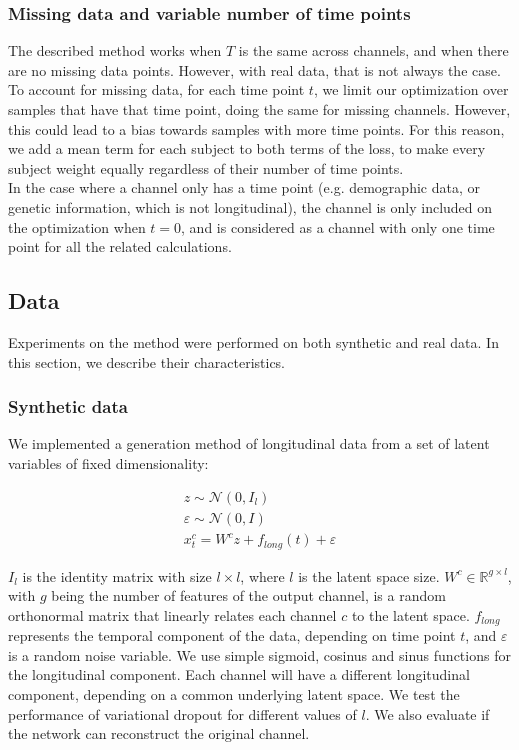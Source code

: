 \subsubsection{Missing data and variable number of time points}

The described method works when $T$ is the same across channels, and when there are no missing data points. However, with real data, that is not always the case. To account for missing data, for each time point $t$, we limit our optimization over samples that have that time point, doing the same for missing channels. However, this could lead to a bias towards samples with more time points. For this reason, we add a mean term for each subject to both terms of the loss, to make every subject weight equally regardless of their number of time points. \\

In the case where a channel only has a time point (e.g. demographic data, or genetic information, which is not longitudinal), the channel is only included on the optimization when $t=0$, and is considered as a channel with only one time point for all the related calculations.

\subsection{Data}

Experiments on the method were performed on both synthetic and real data. In this section, we describe their characteristics.

\subsubsection{Synthetic data}

We implemented a generation method of longitudinal data from a set of latent variables of fixed dimensionality:

\begin{equation} 
\begin{gathered} \label{rnn:eq:synthdata}
   z \sim \mathcal{N}(0, I_{l}) \\
   \varepsilon \sim \mathcal{N}(0, I) \\
   x^c_t = W^{c}z + f_{long}(t) + \varepsilon
\end{gathered}
\end{equation}

$I_{l}$ is the identity matrix with size $l \times l$, where $l$ is the latent space size. $W^c \in \mathbb{R}^{g \times l}$, with $g$ being the number of features of the output channel, is a random orthonormal matrix that linearly relates each channel $c$ to the latent space.  $f_{long}$ represents the temporal component of the data, depending on time point $t$, and $\varepsilon$ is a random noise variable. We use simple sigmoid, cosinus and sinus functions for the longitudinal component. Each channel will have a different longitudinal component, depending on a common underlying latent space. We test the performance of variational dropout for different values of $l$. We also evaluate if the network can reconstruct the original channel.   \\

